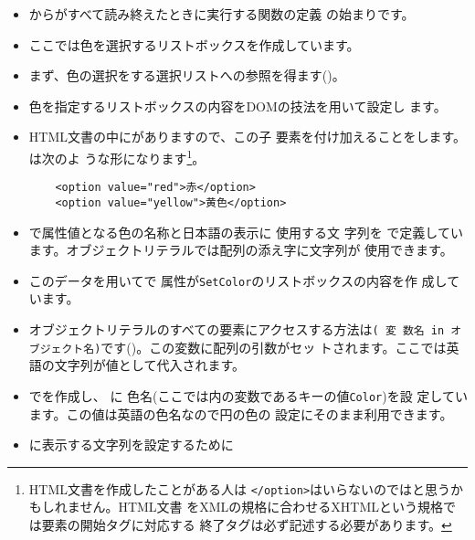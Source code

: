 \begin{itemize}
 \item {}から\HTML がすべて読み終えたときに実行する関数の定義
       の始まりです。
  \item ここでは色を選択するリストボックスを作成しています。
 \item まず、色の選択をする選択リストへの参照を得ます()。
  \item 色を指定するリストボックスの内容をDOMの技法を用いて設定し
       ます。
 \item HTML文書の中にがありますので、この子
       要素を付け加えることをします。は次のよ
       うな形になります\footnote{HTML文書を作成したことがある人は
       \texttt{</option>}はいらないのではと思うかもしれません。HTML文書
       をXMLの規格に合わせるXHTMLという規格では要素の開始タグに対応する
       終了タグは必ず記述する必要があります。}。
\begin{Verbatim}
	<option value="red">赤</option>
	<option value="yellow">黄色</option>
\end{Verbatim}
 \item {}で属性値となる色の名称と日本語の表示に
       使用する文
       字列を%
       で定義しています。オブジェクトリテラルでは配列の添え字に文字列が
       使用できます。
\iffalse
       左側にある文字列は\keysub{キー}{オブジェクトリテラル}{の}と呼
       ばれます。\texttt{:}をはさんだ右側はこのキーにおける値であり、こ
       こには任意の\JS のオブジェクトを記述できます。値は「オブジェクト
       名[キー]」の
       形で取り扱うことができます(\Line{createTextNode}参照)。
\fi
 \item このデータを用いてで
       属性が\texttt{SetColor}のリストボックスの内容を作
       成しています。
 \item オブジェクトリテラルのすべての要素にアクセスする方法は\texttt{( 変
       数名 in オブジェクト名)}です()。この変数に配列の引数がセッ
       トされます。ここでは英語の文字列が値として代入されます。
 \item {}でを作成し、
       に
       色名(ここでは内の変数であるキーの値\texttt{Color})を設
       定しています。この値は英語の色名なので円の色の
       設定にそのまま利用できます。
 \item {}に表示する文字列を設定するために

\end{itemize}
